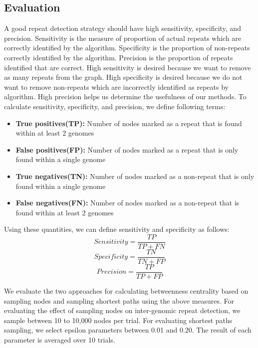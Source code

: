 \documentclass[runningheads,a4paper]{llncs}
\begin{document}
\subsection*{Evaluation}
A good repeat detection strategy should have high sensitivity, specificity, and precision. Sensitivity is the measure of proportion of actual repeats which are correctly identified by the algorithm. Specificity is the proportion of non-repeats correctly identified by the algorithm. Precision is the proportion of repeats identified that are correct. High sensitivity is desired because we want to remove as many repeats from the graph. High specificity is desired because we do not want to remove non-repeats which are incorrectly identified as repeats by algorithm. High precision helps us determine the usefulness of our methods. To calculate sensitivity, specificity, and precision, we define following terms:
\begin{itemize}
\item \textbf{True positives(TP):} Number of nodes marked as a repeat that is found within at least 2 genomes
\item \textbf{False positives(FP):} Number of nodes marked as a repeat that is only found within a single genome
\item \textbf{True negatives(TN):} Number of nodes marked as a non-repeat that is only found within a single genome
\item \textbf{False negatives(FN):} Number of nodes marked as a non-repeat that is found within at least 2 genomes
\end{itemize}

Using these quantities, we can define sensitivity and specificity as follows:
 $$Sensitivity = \frac{TP}{TP+FN}$$
 $$Specificity = \frac{TN}{TN+FP}$$
 $$Precision = \frac{TP}{TP + FP}$$

We evaluate the two approaches for calculating betweenness centrality based on sampling nodes and sampling shortest paths using the above measures.
For evaluating the effect of sampling nodes on inter-genomic repeat detection, we sample between 10 to 10,000 nodes per trial.
For evaluating shortest paths sampling, we select epsilon parameters between 0.01 and 0.20.
The result of each parameter is averaged over 10 trials.
\end{document}
